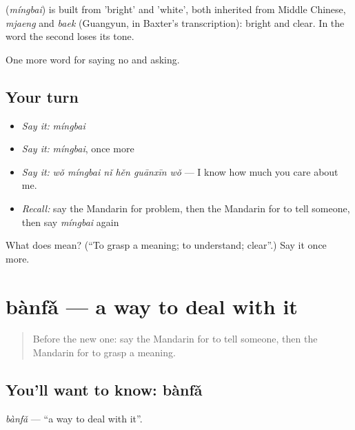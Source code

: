 \begin{cousinweb}
\textbf{} (\emph{míngbai}) is built from  'bright' and  'white', both inherited from Middle Chinese, \emph{mjaeng} and \emph{baek} (Guangyun, in Baxter's transcription): bright and clear. In the word the second loses its tone.
\end{cousinweb}

\begin{grammarlens}[title={What you've built}]
One more word for saying no and asking.
\end{grammarlens}

\subsection*{Your turn}
\begin{itemize}
\raggedright
  \item \emph{Say it:} \emph{míngbai}
  \item \emph{Say it:} \emph{míngbai}, once more
  \item \emph{Say it:} \emph{wǒ míngbai nǐ hěn guānxīn wǒ} — I know how much you care about me.
  \item \emph{Recall:} say the Mandarin for problem, then the Mandarin for to tell someone, then say \emph{míngbai} again
\end{itemize}

\begin{tcolorbox}[breakable,colback=teal!4,colframe=teal!35!black,title={Before you move on}]
What does  mean? (\textquotedblleft{}To grasp a meaning; to understand; clear\textquotedblright{}.) Say it once more.
\end{tcolorbox}
\section[bànfǎ]{bànfǎ — a way to deal with it}

\label{lesson:ZH-C214-banfa}



\begin{quote}
Before the new one: say the Mandarin for to tell someone, then the Mandarin for to grasp a meaning.
\end{quote}

\subsection*{You'll want to know: bànfǎ}
\emph{bànfǎ} — \textquotedblleft{}a way to deal with it\textquotedblright{}.

